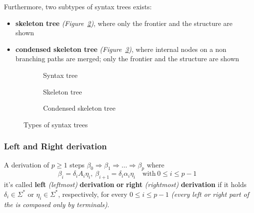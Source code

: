 \documentclass[english]{article}
\begin{document}
Furthermore, two subtypes of syntax trees exists:

\begin{itemize}
  \item \textbf{skeleton tree} \textit{(Figure~\ref{subfig:skeleton-tree})}, where only the frontier and the structure are shown
  \item \textbf{condensed skeleton tree} \textit{(Figure~\ref{subfig:condensed-skeleton-tree})}, where internal nodes on a non branching paths are merged; only the frontier and the structure are shown
\end{itemize}

\begin{figure}[htbp]
  \bigskip
  \centering
  \begin{subfigure}[t]{0.99\textwidth}
    \bigskip
    \centering
    \caption{Syntax tree}
    \label{subfig:syntax-tree}
    \bigskip
  \end{subfigure}
  \bigskip
  \begin{subfigure}[t]{0.495\textwidth}
    \bigskip
    \centering
    \caption{Skeleton tree}
    \label{subfig:skeleton-tree}
    \bigskip
  \end{subfigure}
  \begin{subfigure}[t]{0.495\textwidth}
    \bigskip
    \centering
        \caption{Condensed skeleton tree}
    \label{subfig:condensed-skeleton-tree}
    \bigskip
  \end{subfigure}

  \caption{Types of syntax trees}
  \label{fig:types-of-syntax-trees}
\end{figure}

\subsubsection{Left and Right derivation}
\label{sec:left-right-derivation}

A derivation of \(p \geq 1\) steps \(\beta_0 \Rightarrow \beta_1 \Rightarrow \ldots \Rightarrow \beta_p\) where
\[ \beta_i = \delta_i A_i \eta_i, \ \beta_{i+1} = \delta_i \alpha_i \eta_i \quad \text{with} \ 0 \leq i \leq p-1 \]
it's called \textbf{left} \textit{(leftmost)} \textbf{derivation} \textbf{or} \textbf{right} \textit{(rightmost)} \textbf{derivation} if it holds \(\delta_i \in \Sigma^\ast\) or \(\eta_i \in \Sigma^\ast\), respectively, for every \(0 \leq i \leq p-1\) \textit{(every left or right part of the \RP is composed only by terminals)}.
\end{document}
